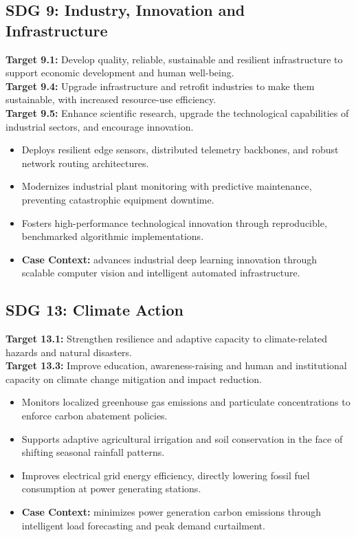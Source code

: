 \subsection{SDG 9: Industry, Innovation and Infrastructure}
\noindent\textbf{Target 9.1:} Develop quality, reliable, sustainable and resilient infrastructure to support economic development and human well-being. \\
\noindent\textbf{Target 9.4:} Upgrade infrastructure and retrofit industries to make them sustainable, with increased resource-use efficiency. \\
\noindent\textbf{Target 9.5:} Enhance scientific research, upgrade the technological capabilities of industrial sectors, and encourage innovation.
\begin{itemize}
  \item Deploys resilient edge sensors, distributed telemetry backbones, and robust network routing architectures.
  \item Modernizes industrial plant monitoring with predictive maintenance, preventing catastrophic equipment downtime.
  \item Fosters high-performance technological innovation through reproducible, benchmarked algorithmic implementations.
  \item \textbf{Case Context:} advances industrial deep learning innovation through scalable computer vision and intelligent automated infrastructure.
\end{itemize}

\subsection{SDG 13: Climate Action}
\noindent\textbf{Target 13.1:} Strengthen resilience and adaptive capacity to climate-related hazards and natural disasters. \\
\noindent\textbf{Target 13.3:} Improve education, awareness-raising and human and institutional capacity on climate change mitigation and impact reduction.
\begin{itemize}
  \item Monitors localized greenhouse gas emissions and particulate concentrations to enforce carbon abatement policies.
  \item Supports adaptive agricultural irrigation and soil conservation in the face of shifting seasonal rainfall patterns.
  \item Improves electrical grid energy efficiency, directly lowering fossil fuel consumption at power generating stations.
  \item \textbf{Case Context:} minimizes power generation carbon emissions through intelligent load forecasting and peak demand curtailment.
\end{itemize}

